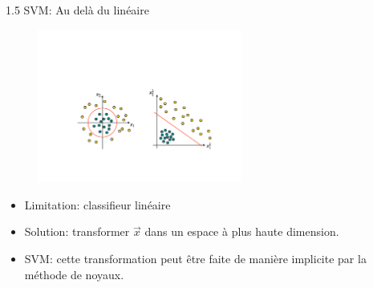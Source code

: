 
\begin{frame}{1.5 SVM: Au delà du linéaire}
  \begin{figure}[htb]
    \includegraphics[width=0.6\textwidth]{figures/KernelTrick.pdf}
  \end{figure}
  \begin{itemize}
    \item Limitation: classifieur linéaire
    \item Solution: transformer $\overrightarrow{x}$ dans un espace à plus haute dimension.
    \item SVM: cette transformation peut être faite de manière implicite par la méthode de noyaux. 
  \end{itemize}
\end{frame}


